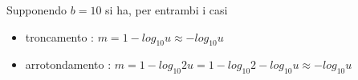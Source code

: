 Supponendo \( b=10 \) si ha, per entrambi i casi

\begin{itemize}

\item troncamento : \( m = 1 - log_{10}{u} \approx -log_{10}{u} \)
\item arrotondamento : \( m = 1 - log_10{2u} = 1 - log_{10}{2} - log_10{u} \approx -log_{10}{u} \)

\end{itemize}